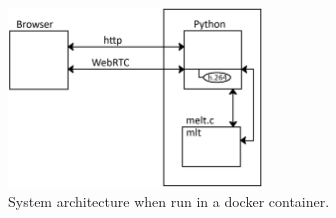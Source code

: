 \documentclass[../MasterThesis.tex]{subfiles}
\begin{document}
\begin{figure}[H]
	\centering
	\includegraphics[width=0.6\textwidth]{IM2.png}
	\caption{System architecture when run in a docker container.}
\end{figure}


%
%
%
%
%
%
%
%
%
%
%
%
%
%
%
\end{document}
